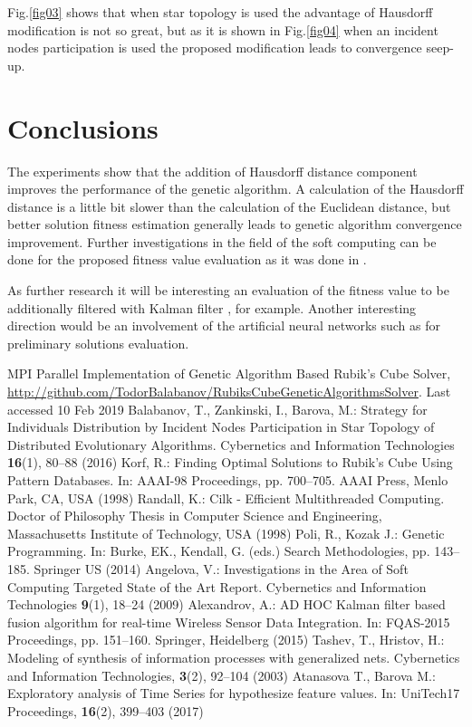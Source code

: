 \documentclass[runningheads]{llncs}
\begin{document}
Fig.\ref{fig03} shows that when star topology is used the advantage of Hausdorff modification is not so great, but as it is shown in Fig.\ref{fig04} when an incident nodes participation is used the proposed modification leads to convergence seep-up.

\section{Conclusions}

The experiments show that the addition of Hausdorff distance component improves the performance of the genetic algorithm. A calculation of the Hausdorff distance is a little bit slower than the calculation of the Euclidean distance, but better solution fitness estimation generally leads to genetic algorithm convergence improvement. Further investigations in the field of the soft computing can be done for the proposed fitness value evaluation as it was done in \cite{angelova01}.

As further research it will be interesting an evaluation of the fitness value to be additionally filtered with Kalman filter \cite{alexandrov01}, for example. Another interesting direction would be an involvement of the artificial neural networks such as \cite{tashev01,atanasova01} for preliminary solutions evaluation.

\begin{thebibliography}{8}
MPI Parallel Implementation of Genetic Algorithm Based Rubik’s Cube Solver, \url{http://github.com/TodorBalabanov/RubiksCubeGeneticAlgorithmsSolver}. Last accessed 10 Feb 2019
Balabanov, T., Zankinski, I., Barova, M.: Strategy for Individuals Distribution by Incident Nodes Participation in Star Topology of Distributed Evolutionary Algorithms. Cybernetics and Information Technologies \textbf{16}(1), 80--88 (2016)
Korf, R.: Finding Optimal Solutions to Rubik’s Cube Using Pattern Databases. In: AAAI-98 Proceedings, pp. 700--705. AAAI Press, Menlo Park, CA, USA (1998)
Randall, K.: Cilk - Efficient Multithreaded Computing. Doctor of Philosophy Thesis in Computer Science and Engineering, Massachusetts Institute of Technology, USA (1998) 
Poli, R., Kozak J.: Genetic Programming. In: Burke, EK., Kendall, G. (eds.) Search Methodologies, pp. 143--185. Springer US (2014)
Angelova, V.: Investigations in the Area of Soft Computing Targeted State of the Art Report. Cybernetics and Information Technologies \textbf{9}(1), 18--24 (2009)
Alexandrov, A.: AD HOC Kalman filter based fusion algorithm for real-time Wireless Sensor Data Integration. In: FQAS-2015 Proceedings, pp. 151--160. Springer, Heidelberg (2015)
Tashev, T., Hristov, H.: Modeling of synthesis of information processes with generalized nets. Cybernetics and Information Technologies, \textbf{3}(2), 92--104 (2003) 
Atanasova T., Barova M.: Exploratory analysis of Time Series for hypothesize feature values. In: UniTech17 Proceedings,  \textbf{16}(2), 399--403 (2017)
\end{thebibliography}
\end{document}
